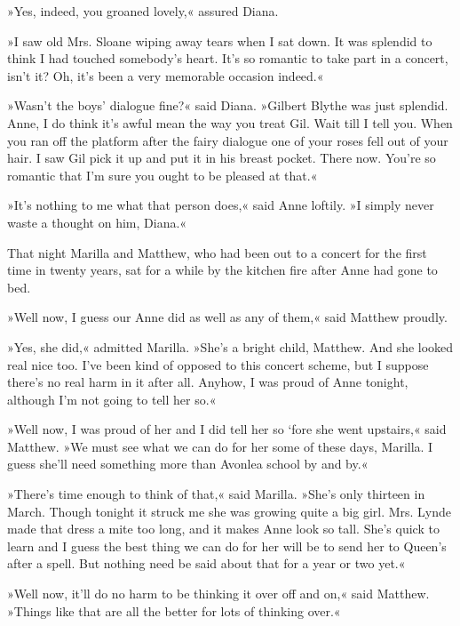 »Yes, indeed, you groaned lovely,« assured Diana.

»I saw old Mrs. Sloane wiping away tears when I sat down. It was splendid to think I had touched somebody's heart. It's so romantic to take part in a concert, isn't it? Oh, it's been a very memorable occasion indeed.«

»Wasn't the boys' dialogue fine?« said Diana. »Gilbert Blythe was just splendid. Anne, I do think it's awful mean the way you treat Gil. Wait till I tell you. When you ran off the platform after the fairy dialogue one of your roses fell out of your hair. I saw Gil pick it up and put it in his breast pocket. There now. You're so romantic that I'm sure you ought to be pleased at that.«

»It's nothing to me what that person does,« said Anne loftily. »I simply never waste a thought on him, Diana.«

That night Marilla and Matthew, who had been out to a concert for the first time in twenty years, sat for a while by the kitchen fire after Anne had gone to bed.

»Well now, I guess our Anne did as well as any of them,« said Matthew proudly.

»Yes, she did,« admitted Marilla. »She's a bright child, Matthew. And she looked real nice too. I've been kind of opposed to this concert scheme, but I suppose there's no real harm in it after all. Anyhow, I was proud of Anne tonight, although I'm not going to tell her so.«

»Well now, I was proud of her and I did tell her so ‘fore she went upstairs,« said Matthew. »We must see what we can do for her some of these days, Marilla. I guess she'll need something more than Avonlea school by and by.«

»There's time enough to think of that,« said Marilla. »She's only thirteen in March. Though tonight it struck me she was growing quite a big girl. Mrs. Lynde made that dress a mite too long, and it makes Anne look so tall. She's quick to learn and I guess the best thing we can do for her will be to send her to Queen's after a spell. But nothing need be said about that for a year or two yet.«

»Well now, it'll do no harm to be thinking it over off and on,« said Matthew. »Things like that are all the better for lots of thinking over.«